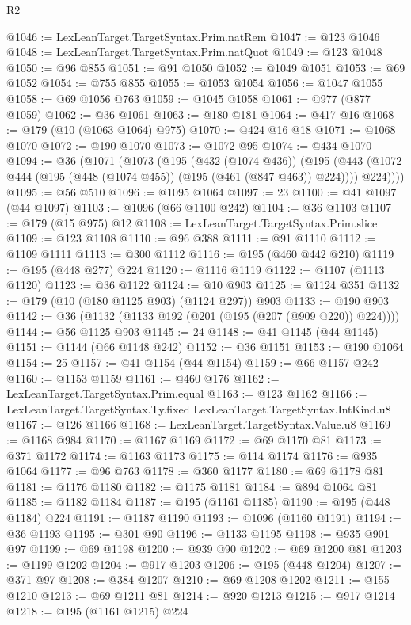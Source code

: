 \begin{lexlean}{R2}
\begin{coremodule}
@1046 := LexLeanTarget.TargetSyntax.Prim.natRem
@1047 := @123 @1046
@1048 := LexLeanTarget.TargetSyntax.Prim.natQuot
@1049 := @123 @1048
@1050 := @96 @855
@1051 := @91 @1050
@1052 := @1049 @1051
@1053 := @69 @1052
@1054 := @755 @855
@1055 := @1053 @1054
@1056 := @1047 @1055
@1058 := @69 @1056 @763
@1059 := @1045 @1058
@1061 := @977 (@877 @1059)
@1062 := @36 @1061
@1063 := @180 @181
@1064 := @417 @16
@1068 := @179 (@10 (@1063 @1064) @975)
@1070 := @424 @16 @18
@1071 := @1068 @1070
@1072 := @190 @1070
@1073 := @1072 @95
@1074 := @434 @1070
@1094 := @36
    (@1071
      (@1073
        (@195
          (@432 (@1074 @436))
          (@195
            (@443 (@1072 @444 (@195 (@448 (@1074 @455)) (@195 (@461 (@847 @463)) @224))))
            @224))))
@1095 := @56 @510
@1096 := @1095 @1064
@1097 := 23
@1100 := @41 @1097 (@44 @1097)
@1103 := @1096 (@66 @1100 @242)
@1104 := @36 @1103
@1107 := @179 (@15 @975) @12
@1108 := LexLeanTarget.TargetSyntax.Prim.slice
@1109 := @123 @1108
@1110 := @96 @388
@1111 := @91 @1110
@1112 := @1109 @1111
@1113 := @300 @1112
@1116 := @195 (@460 @442 @210)
@1119 := @195 (@448 @277) @224
@1120 := @1116 @1119
@1122 := @1107 (@1113 @1120)
@1123 := @36 @1122
@1124 := @10 @903
@1125 := @1124 @351
@1132 := @179 (@10 (@180 @1125 @903) (@1124 @297)) @903
@1133 := @190 @903
@1142 := @36 (@1132 (@1133 @192 (@201 (@195 (@207 (@909 @220)) @224))))
@1144 := @56 @1125 @903
@1145 := 24
@1148 := @41 @1145 (@44 @1145)
@1151 := @1144 (@66 @1148 @242)
@1152 := @36 @1151
@1153 := @190 @1064
@1154 := 25
@1157 := @41 @1154 (@44 @1154)
@1159 := @66 @1157 @242
@1160 := @1153 @1159
@1161 := @460 @176
@1162 := LexLeanTarget.TargetSyntax.Prim.equal
@1163 := @123 @1162
@1166 := LexLeanTarget.TargetSyntax.Ty.fixed LexLeanTarget.TargetSyntax.IntKind.u8
@1167 := @126 @1166
@1168 := LexLeanTarget.TargetSyntax.Value.u8
@1169 := @1168 @984
@1170 := @1167 @1169
@1172 := @69 @1170 @81
@1173 := @371 @1172
@1174 := @1163 @1173
@1175 := @114 @1174
@1176 := @935 @1064
@1177 := @96 @763
@1178 := @360 @1177
@1180 := @69 @1178 @81
@1181 := @1176 @1180
@1182 := @1175 @1181
@1184 := @894 @1064 @81
@1185 := @1182 @1184
@1187 := @195 (@1161 @1185)
@1190 := @195 (@448 @1184) @224
@1191 := @1187 @1190
@1193 := @1096 (@1160 @1191)
@1194 := @36 @1193
@1195 := @301 @90
@1196 := @1133 @1195
@1198 := @935 @901 @97
@1199 := @69 @1198
@1200 := @939 @90
@1202 := @69 @1200 @81
@1203 := @1199 @1202
@1204 := @917 @1203
@1206 := @195 (@448 @1204)
@1207 := @371 @97
@1208 := @384 @1207
@1210 := @69 @1208 @1202
@1211 := @155 @1210
@1213 := @69 @1211 @81
@1214 := @920 @1213
@1215 := @917 @1214
@1218 := @195 (@1161 @1215) @224

\end{coremodule}
\end{lexlean}
